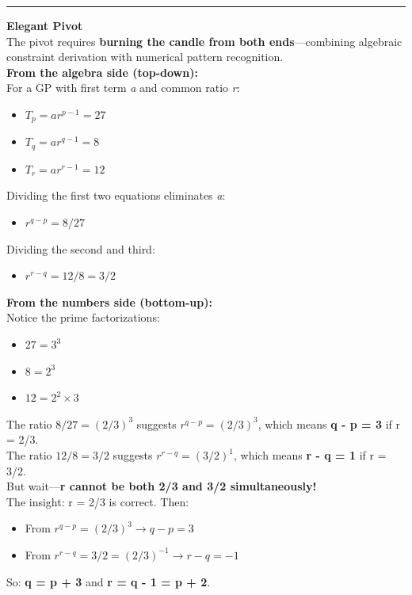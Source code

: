 \documentclass{article}
\begin{document}
\noindent \rule{\textwidth}{0.4pt}

\noindent \textbf{Elegant Pivot} \\

\noindent The pivot requires \textbf{burning the candle from both ends}—combining algebraic constraint derivation with numerical pattern recognition. \\

\noindent \textbf{From the algebra side (top-down):} \\
\noindent For a GP with first term \textit{a} and common ratio \textit{r}:
\begin{itemize}
    \item $T_p = ar^{p-1} = 27$
    \item $T_q = ar^{q-1} = 8$
    \item $T_r = ar^{r-1} = 12$
\end{itemize}
\noindent Dividing the first two equations eliminates \textit{a}:
\begin{itemize}
    \item $r^{q-p} = 8/27$
\end{itemize}
\noindent Dividing the second and third:
\begin{itemize}
    \item $r^{r-q} = 12/8 = 3/2$
\end{itemize}

\noindent \textbf{From the numbers side (bottom-up):} \\
\noindent Notice the prime factorizations:
\begin{itemize}
    \item $27 = 3^3$
    \item $8 = 2^3$
    \item $12 = 2^2 \times 3$
\end{itemize}
\noindent The ratio $8/27 = (2/3)^3$ suggests $r^{q-p} = (2/3)^3$, which means \textbf{q - p = 3} if r = 2/3. \\

\noindent The ratio $12/8 = 3/2$ suggests $r^{r-q} = (3/2)^1$, which means \textbf{r - q = 1} if r = 3/2. \\

\noindent But wait—\textbf{r cannot be both 2/3 and 3/2 simultaneously!} \\

\noindent The insight: r = 2/3 is correct. Then:
\begin{itemize}
    \item From $r^{q-p} = (2/3)^3 \to q - p = 3$
    \item From $r^{r-q} = 3/2 = (2/3)^{-1} \to r - q = -1$
\end{itemize}
\noindent So: \textbf{q = p + 3} and \textbf{r = q - 1 = p + 2}. \\
\end{document}

